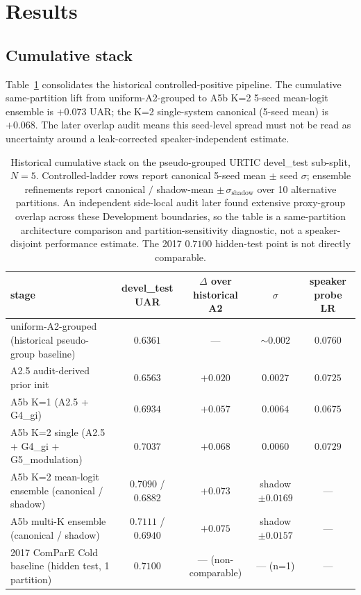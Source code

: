 \section{Results}
\label{sec:results}

\subsection{Cumulative stack}

Table~\ref{tab:stack} consolidates the historical controlled-positive pipeline. The cumulative same-partition lift from uniform-A2-grouped to A5b K=2 5-seed mean-logit ensemble is $+0.073$ UAR; the K=2 single-system canonical (5-seed mean) is $+0.068$. The later overlap audit means this seed-level spread must not be read as uncertainty around a leak-corrected speaker-independent estimate.

\begin{table}[t]
\centering\small
\caption{Historical cumulative stack on the pseudo-grouped URTIC devel\_test sub-split, $N{=}5$. Controlled-ladder rows report canonical 5-seed mean $\pm$ seed $\sigma$; ensemble refinements report canonical $/$ shadow-mean $\pm\,\sigma_{\text{shadow}}$ over 10 alternative partitions. An independent side-local audit later found extensive proxy-group overlap across these Development boundaries, so the table is a same-partition architecture comparison and partition-sensitivity diagnostic, not a speaker-disjoint performance estimate. The 2017 $0.7100$ hidden-test point is not directly comparable.}
\label{tab:stack}
\begin{tabular}{lcccc}
\toprule
stage & devel\_test UAR & $\Delta$ over historical A2 & $\sigma$ & speaker probe LR \\
\midrule
uniform-A2-grouped (historical pseudo-group baseline)& $0.6361$            & ---       & $\sim 0.002$ & $0.0760$ \\
A2.5 audit-derived prior init                        & $0.6563$            & $+0.020$  & $0.0027$    & $0.0725$ \\
A5b K=1 (A2.5 + G4\_gi)                              & $0.6934$            & $+0.057$  & $0.0064$    & $0.0675$ \\
A5b K=2 single (A2.5 + G4\_gi + G5\_modulation)      & $\mathbf{0.7037}$   & $+0.068$  & $\mathbf{0.0060}$ & $0.0729$ \\
A5b K=2 mean-logit ensemble (canonical / shadow)     & $0.7090$ / $0.6882$ & $+0.073$  & shadow $\pm0.0169$ & --- \\
A5b multi-K ensemble (canonical / shadow)            & $\mathbf{0.7111}$ / $0.6940$ & $+0.075$ & shadow $\pm0.0157$ & --- \\
\midrule
2017 ComParE Cold baseline (hidden test, 1 partition) & $0.7100$           & --- (non-comparable) & --- (n=1) & --- \\
\bottomrule
\end{tabular}
\end{table}

